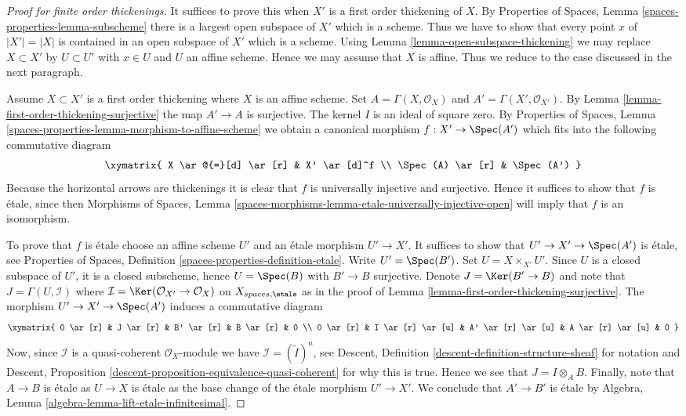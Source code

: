 \begin{proof}[Proof for finite order thickenings]
It suffices to prove this when $X'$ is a first order thickening of $X$. By
Properties of Spaces, Lemma \ref{spaces-properties-lemma-subscheme}
there is a largest open subspace of $X'$ which is a scheme. Thus we have
to show that every point $x$ of $|X'| = |X|$ is contained in an open subspace of
$X'$ which is a scheme. Using
Lemma \ref{lemma-open-subspace-thickening}
we may replace $X \subset X'$ by $U \subset U'$ with $x \in U$ and $U$
an affine scheme. Hence we may assume that $X$ is affine.
Thus we reduce to the case discussed in the next paragraph.

\medskip\noindent
Assume $X \subset X'$ is a first order thickening where $X$ is an affine
scheme. Set $A = \Gamma(X, \mathcal{O}_X)$ and
$A' = \Gamma(X', \mathcal{O}_{X'})$. By
Lemma \ref{lemma-first-order-thickening-surjective}
the map $A' \to A$ is surjective. The kernel $I$ is an ideal of square zero. By
Properties of Spaces,
Lemma \ref{spaces-properties-lemma-morphism-to-affine-scheme}
we obtain a canonical morphism $f : X' \to \Spec(A')$ which fits
into the following commutative diagram
$$
\xymatrix{
X \ar@{=}[d] \ar[r] &  X' \ar[d]^f \\
\Spec(A) \ar[r] & \Spec(A')
}
$$
Because the horizontal arrows are thickenings it is clear that $f$ is
universally injective and surjective. Hence it suffices to show that
$f$ is \'etale, since then
Morphisms of Spaces,
Lemma \ref{spaces-morphisms-lemma-etale-universally-injective-open}
will imply that $f$ is an isomorphism.

\medskip\noindent
To prove that $f$ is \'etale choose an affine scheme $U'$ and an
\'etale morphism $U' \to X'$. It suffices to show that
$U' \to X' \to \Spec(A')$ is \'etale, see
Properties of Spaces, Definition \ref{spaces-properties-definition-etale}.
Write $U' = \Spec(B')$. Set $U = X \times_{X'} U'$. Since $U$
is a closed subspace of $U'$, it is a closed subscheme, hence
$U = \Spec(B)$ with $B' \to B$ surjective. Denote
$J = \Ker(B' \to B)$ and note that $J = \Gamma(U, \mathcal{I})$
where $\mathcal{I} = \Ker(\mathcal{O}_{X'} \to \mathcal{O}_X)$
on $X_{spaces, \etale}$ as in the proof of
Lemma \ref{lemma-first-order-thickening-surjective}.
The morphism $U' \to X' \to \Spec(A')$ induces a commutative
diagram
$$
\xymatrix{
0 \ar[r] &
J \ar[r] &
B' \ar[r] &
B \ar[r] & 0 \\
0 \ar[r] &
I \ar[r] \ar[u] &
A' \ar[r] \ar[u] &
A \ar[r] \ar[u] & 0
}
$$
Now, since $\mathcal{I}$ is a quasi-coherent $\mathcal{O}_X$-module
we have $\mathcal{I} = (\widetilde I)^a$, see
Descent, Definition \ref{descent-definition-structure-sheaf}
for notation and
Descent, Proposition \ref{descent-proposition-equivalence-quasi-coherent}
for why this is true. Hence we see that $J = I \otimes_A B$.
Finally, note that $A \to B$ is \'etale as $U \to X$ is \'etale as
the base change of the \'etale morphism $U' \to X'$.
We conclude that $A' \to B'$ is \'etale by
Algebra, Lemma \ref{algebra-lemma-lift-etale-infinitesimal}.
\end{proof}

